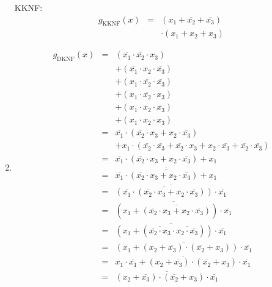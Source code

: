 \documentclass[DIN, pagenumber=false, fontsize=11pt, parskip=half]{scrartcl}
\begin{document}
\begin{enumerate}[label=(\alph*)]
            KKNF:
            \begin{eqnarray*}
                g_\text{KKNF}(x) &=& (x_1 + \overline{x_2} + \overline{x_3})\\
                &&\cdot (x_1 + x_2 + x_3)
            \end{eqnarray*}
        \item
            \begin{eqnarray*}
                g_\text{DKNF}(x) &=& (\overline{x_1} \cdot \overline{x_2} \cdot x_3)\\
                &&+ (\overline{x_1} \cdot x_2 \cdot \overline{x_3})\\
                &&+ (x_1 \cdot \overline{x_2} \cdot \overline{x_3})\\
                &&+ (x_1 \cdot \overline{x_2} \cdot x_3)\\
                &&+ (x_1 \cdot x_2  \cdot \overline{x_3})\\
                &&+ (x_1 \cdot x_2 \cdot x_3)\\
                &=& \overline{x_1} \cdot (\overline{x_2} \cdot x_3 + x_2 \cdot \overline{x_3})\\
                &&+ x_1 \cdot (\overline{x_2} \cdot \overline{x_3} + \overline{x_2} \cdot x_3 + x_2 \cdot \overline{x_3} + \overline{x_2} \cdot \overline{x_3})\\
                &=& \overline{x_1} \cdot (\overline{x_2} \cdot x_3 + x_2 \cdot \overline{x_3}) + x_1\\
                &=& \overline{\overline{\overline{x_1} \cdot (\overline{x_2} \cdot x_3 + x_2 \cdot \overline{x_3}) + x_1}}\\
                &=& \overline{\overline{(\overline{x_1} \cdot (\overline{x_2} \cdot x_3 + x_2 \cdot \overline{x_3}))} \cdot \overline{x_1}} \\
                &=& \overline{(x_1 + \overline{(\overline{x_2} \cdot x_3 + x_2 \cdot \overline{x_3})}) \cdot \overline{x_1}} \\
                &=& \overline{(x_1 + (\overline{\overline{x_2} \cdot x_3} \cdot \overline{x_2 \cdot \overline{x_3}})) \cdot \overline{x_1}}\\
                &=& \overline{(x_1 + (x_2 + \overline{x_3}) \cdot (\overline{x_2} + x_3)) \cdot \overline{x_1}}\\
                &=& \overline{x_1 \cdot \overline {x_1} + (x_2 + \overline{x_3}) \cdot (\overline{x_2} + x_3) \cdot \overline{x_1}}\\
                &=& \overline{(x_2 + \overline{x_3}) \cdot (\overline{x_2} + x_3) \cdot \overline{x_1}}\\

\end{eqnarray*}
\end{enumerate}
\end{document}
